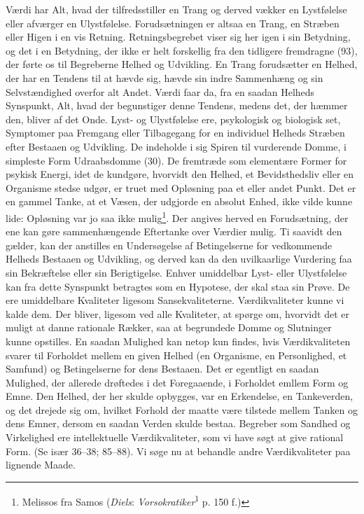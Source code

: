 \documentclass[12pt,a4paper]{book}
\newcommand{\apage}[1]{\marginnote{\footnotesize\textit{[#1]}}}
\begin{document}
Værdi har Alt, hvad der tilfredsstiller en Trang og derved vækker en Lystfølelse
eller afværger en Ulystfølelse. Forudsætningen er altsaa en Trang, en Stræben
eller Higen i en vis Retning. Retningsbegrebet viser sig her igen i sin Betydning,
og det i en Betydning, der ikke er helt forskellig fra den tidligere fremdragne
(93), der førte os til Begreberne Helhed og Udvikling. En Trang forudsætter en
Helhed, der har en Tendens til at hævde sig, hævde sin indre Sammenhæng og sin
Selvstændighed overfor alt Andet. Værdi faar da, fra en saadan Helheds Synspunkt,
Alt, hvad der begunstiger denne Tendens, medens det, der hæmmer den, bliver af det
Onde. Lyst- og Ulystfølelse ere, psykologisk og biologisk set, Symptomer paa
Fremgang eller Tilbagegang for en individuel Helheds Stræben efter Bestaaen og
Udvikling. De indeholde i sig Spiren til vurderende Domme, i simpleste Form
Udraabsdomme (30). De fremtræde som elementære Former for psykisk Energi, idet de
kundgøre, hvorvidt den Helhed, et Bevidsthedsliv eller en Organisme stedse udgør,
er truet med Opløsning paa et eller andet Punkt. Det er en gammel Tanke, at et
Væsen, der udgjorde en absolut Enhed, ikke vilde kunne lide: Opløsning var jo saa
ikke mulig\footnote{Melissos fra Samos (\emph{Diels}:
\emph{Vorsokratiker}\textsuperscript{1} p. 150 f.)}. Der angives herved en
Forudsætning, der ene kan gøre sammenhængende Eftertanke over Værdier mulig. Ti
saavidt den gælder, kan der anstilles en Undersøgelse af Betingelserne for
vedkommende Helheds Bestaaen og Udvikling, og derved kan da den uvilkaarlige
Vurdering faa sin Bekræftelse eller sin Berigtigelse. \apage{239} Enhver umiddelbar Lyst-
eller Ulystfølelse kan fra dette Synspunkt betragtes som en Hypotese, der skal
staa sin Prøve. De ere umiddelbare Kvaliteter ligesom Sansekvaliteterne.
Værdikvaliteter kunne vi kalde dem. Der bliver, ligesom ved alle Kvaliteter, at
spørge om, hvorvidt det er muligt at danne rationale Rækker, saa at begrundede
Domme og Slutninger kunne opstilles. En saadan Mulighed kan netop kun findes, hvis
Værdikvaliteten svarer til Forholdet mellem en given Helhed (en Organisme, en
Personlighed, et Samfund) og Betingelserne for dens Bestaaen. Det er egentligt en
saadan Mulighed, der allerede drøftedes i det Foregaaende, i Forholdet emllem Form
og Emne. Den Helhed, der her skulde opbygges, var en Erkendelse, en Tankeverden,
og det drejede sig om, hvilket Forhold der maatte være tilstede mellem Tanken og
dens Emner, dersom en saadan Verden skulde bestaa. Begreber som Sandhed og
Virkelighed ere intellektuelle Værdikvaliteter, som vi have søgt at give rational
Form. (Se især 36--38; 85--88). Vi søge nu at behandle andre Værdikvaliteter paa
lignende Maade.
\end{document}
